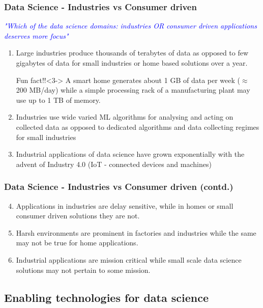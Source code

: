 \documentclass[9pt]{beamer}
\begin{document}
\begin{frame}
 \frametitle{Data Science - Industries vs Consumer driven}
 \textit{\textcolor{blue}{"Which of the data science domains: industries OR consumer driven applications deserves more focus"}}  \\
 \begin{enumerate}
    \item<2-> Large industries produce thousands of terabytes of data as opposed to few gigabytes of data for small industries or home based solutions over a year.

    \begin{block}{Fun fact!!}<3->
        A smart home generates about 1 GB of data per week ($\approx$ 200 MB/day) while a simple processing rack of a manufacturing plant may use up to 1 TB of memory.
    \end{block}

    \item<4-> Industries use wide varied ML algorithms for analysing and acting on collected data as opposed to dedicated algorithms and data collecting regimes for small industries
    \item<4-> Industrial applications of data science have grown exponentially with the advent of Industry 4.0 (IoT - connected devices and machines)
 \end{enumerate}

\end{frame}

\begin{frame}
 \frametitle{Data Science - Industries vs Consumer driven (contd.)}
 \begin{enumerate}
 \setcounter{enumi}{3}
     \item Applications in industries are delay sensitive, while in homes or small consumer driven solutions they are not.
     \item Harsh environments are prominent in factories and industries while the same may not be true for home applications.
     \item Industrial applications are \alert{mission critical} while small scale data science solutions may not pertain to some mission.
 \end{enumerate}

\end{frame}

\subsection{Enabling technologies for data science}
\end{document}
